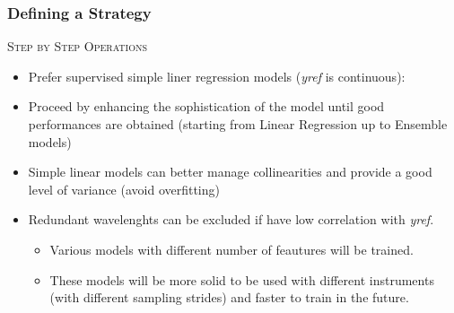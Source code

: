 \begin{frame}
    \frametitle{Defining a Strategy}
        \begin{exampleblock}{\textsc{Step by Step Operations}}
            \begin{itemize}
                \item Prefer supervised simple liner regression models (\textit{yref} is continuous):
                \item Proceed by enhancing the sophistication of the model until good performances are obtained (starting from Linear Regression up to Ensemble models)
                \item Simple linear models can better manage collinearities and provide a good level of variance (avoid overfitting)
            \end{itemize}
            \begin{itemize}
                \item Redundant wavelenghts can be excluded if have low correlation with \textit{yref}.
                \begin{itemize}
                    \item Various models with different number of feautures will be trained.
                    \item These models will be more solid to be used with different instruments (with different sampling strides) and faster to train in the future.
                \end{itemize}
            \end{itemize}
            \end{exampleblock}
    \end{frame}

%         

%             
